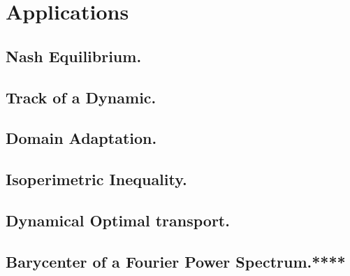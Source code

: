 \chapter{Applications}
\section{Nash Equilibrium.}
\section{Track of a Dynamic.}
\section{Domain Adaptation.}
\section{Isoperimetric Inequality.}
\section{Dynamical Optimal transport.}
\section{Barycenter of a Fourier Power Spectrum.****}


